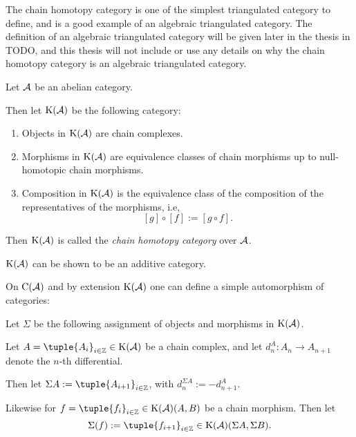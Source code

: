 The chain homotopy category is one of the simplest triangulated category to define, and is a good example of an algebraic triangulated category. The definition of an algebraic triangulated category will be given later in the thesis in TODO, and this thesis will not include or use any details on why the chain homotopy category is an algebraic triangulated category.

\begin{definition}
    \label{def:chain_homotopy_cat}
    Let \( {\mathcal{A}} \) be an abelian category.

    Then let \( \operatorname{K}({\mathcal{A}}) \) be the following category:
    \begin{enumerate}
        \item {
            Objects in \( \operatorname{K}({\mathcal{A}}) \) are chain complexes.
        }
        \item {
            Morphisms in \( \operatorname{K}({\mathcal{A}}) \) are equivalence classes of chain morphisms up to null-homotopic chain morphisms.
        }
        \item {
            Composition in \( \operatorname{K}({\mathcal{A}}) \) is the equivalence class of the composition of the representatives of the morphisms, i.e,
            \[
                [g] \circ [f] := [g \circ f ].
            \]
        }
    \end{enumerate}

    Then \( \operatorname{K}({\mathcal{A}}) \) is called the \emph{chain homotopy category} over \( {\mathcal{A}} \).
\end{definition}

\( \operatorname{K}({\mathcal{A}}) \) can be shown to be an additive category.

On \( \operatorname{C}({\mathcal{A}}) \) and by extension \( \operatorname{K}({\mathcal{A}}) \) one can define a simple automorphism of categories:

\begin{definition}
    \label{def:chain_homotopy_shift}
    Let \( \Sigma \) be the following assignment of objects and morphisms in \( \operatorname{K}({\mathcal{A}}) \).

    Let \( A = \tuple{A_i}_{i \in \Zb} \in \K(\Ac) \) be a chain complex, and let \( d_n^A: A_n \to A_{n + 1} \) denote the \( n \)-th differential.

    Then let \( \Sigma A := \tuple{A_{i + 1}}_{i \in \Zb} \), with \( d_n^{\Sigma A} := -d_{n + 1}^A \).

    Likewise for \( f = \tuple{f_i}_{i \in \Zb} \in \K(\Ac)(A, B) \) be a chain morphism. Then let
    \[
        \Sigma(f) := \tuple{f_{i + 1}}_{i \in \Zb} \in \K(\Ac)(\Sigma A, \Sigma B).
    \]
\end{definition}

